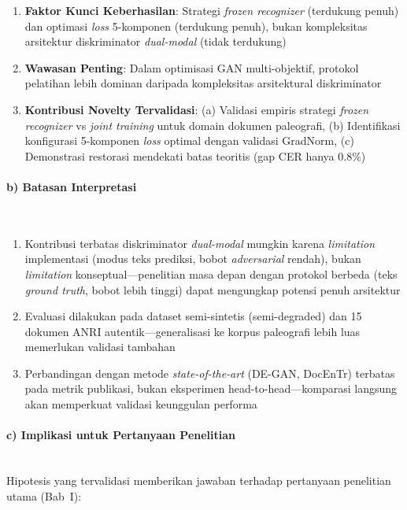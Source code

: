 \documentclass[12pt,a4paper]{article}
\begin{document}
\begin{enumerate}[nosep]
    \item \textbf{Faktor Kunci Keberhasilan}: Strategi \textit{frozen recognizer} (terdukung penuh) dan optimasi \textit{loss} 5-komponen (terdukung penuh), bukan kompleksitas arsitektur diskriminator \textit{dual-modal} (tidak terdukung)
    \item \textbf{Wawasan Penting}: Dalam optimisasi GAN multi-objektif, protokol pelatihan lebih dominan daripada kompleksitas arsitektural diskriminator
    \item \textbf{Kontribusi Novelty Tervalidasi}: (a) Validasi empiris strategi \textit{frozen recognizer} vs \textit{joint training} untuk domain dokumen paleografi, (b) Identifikasi konfigurasi 5-komponen \textit{loss} optimal dengan validasi GradNorm, (c) Demonstrasi restorasi mendekati batas teoritis (gap CER hanya 0.8\%)
\end{enumerate}

\paragraph{b) Batasan Interpretasi}\mbox{}\\[0.1em]
\begin{enumerate}[nosep]
    \item Kontribusi terbatas diskriminator \textit{dual-modal} mungkin karena \textit{limitation} implementasi (modus teks prediksi, bobot \textit{adversarial} rendah), bukan \textit{limitation} konseptual—penelitian masa depan dengan protokol berbeda (teks \textit{ground truth}, bobot lebih tinggi) dapat mengungkap potensi penuh arsitektur
    \item Evaluasi dilakukan pada dataset semi-sintetis (semi-degraded) dan 15 dokumen ANRI autentik—generalisasi ke korpus paleografi lebih luas memerlukan validasi tambahan
    \item Perbandingan dengan metode \textit{state-of-the-art} (DE-GAN, DocEnTr) terbatas pada metrik publikasi, bukan eksperimen head-to-head—komparasi langsung akan memperkuat validasi keunggulan performa
\end{enumerate}

\paragraph{c) Implikasi untuk Pertanyaan Penelitian}\mbox{}\\[0.1em]
Hipotesis yang tervalidasi memberikan jawaban terhadap pertanyaan penelitian utama (Bab~I):
\end{document}

